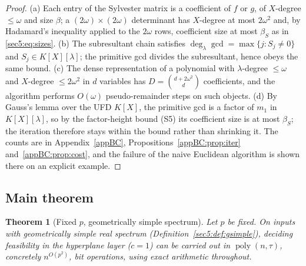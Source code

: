 \documentclass[journal]{IEEEtran}
\theoremstyle{plainn}
\newtheorem{thm}{Theorem}
\theoremstyle{remark}
\newcommand{\poly}{\operatorname{poly}}
\begin{document}
\begin{proof}
(a) Each entry of the Sylvester matrix is a coefficient of $f$ or $g$, of $X$-degree $\le\omega$ and
size $\beta$; a $(2\omega)\times(2\omega)$ determinant has $X$-degree at most $2\omega^{2}$ and, by
Hadamard's inequality applied to the $2\omega$ rows, coefficient size at most $\beta_S$ as in
\eqref{sec5:eq:sizes}. (b) The subresultant chain satisfies $\deg_\lambda\gcd=\max\{j:S_j\neq0\}$ and
$S_j\in K[X][\lambda]$; the primitive gcd divides the subresultant, hence obeys the same bound. (c) The
dense representation of a polynomial with $\lambda$-degree $\le\omega$ and $X$-degree $\le 2\omega^{2}$
in $d$ variables has $D=\binom{d+2\omega^{2}}{d}$ coefficients, and the algorithm performs $O(\omega)$
pseudo-remainder steps on such objects. (d) By Gauss's lemma over the UFD $K[X]$, the primitive gcd is a
factor of $m_1$ in $K[X][\lambda]$, so by the factor-height bound (S5) its coefficient size is at most
$\beta_S$; the iteration therefore stays within the bound rather than shrinking it. The counts are in
Appendix~\ref{appBC}, Propositions~\ref{appBC:prop:iter} and~\ref{appBC:prop:cost}, and the failure of
the naive Euclidean algorithm is shown there on an explicit example.
\end{proof}

\subsection{Main theorem}\label{sec5:sub:main}

\begin{thm}[Fixed $p$, geometrically simple spectrum]\label{sec5:thm:poly}
Let $p$ be fixed. On inputs with geometrically simple real spectrum
(Definition~\ref{sec5:def:gsimple}), deciding feasibility in the hyperplane layer ($c=1$) can be
carried out in $\poly(n,\tau)$, concretely $n^{O(p^{2})}$, bit operations, using exact arithmetic
throughout.
\end{thm}
\end{document}
